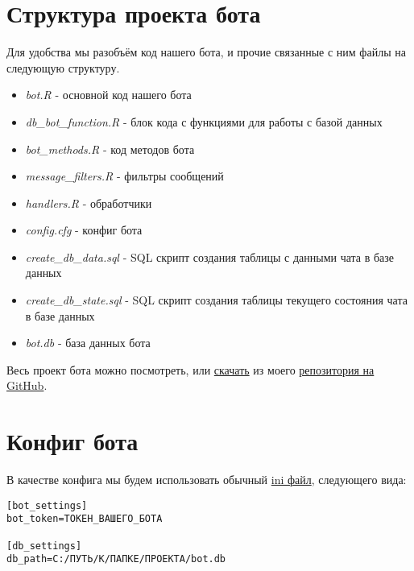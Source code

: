 \documentclass[
]{book}
\providecommand{\tightlist}{%
  \setlength{\itemsep}{0pt}\setlength{\parskip}{0pt}}
\begin{document}
\hypertarget{ux441ux442ux440ux443ux43aux442ux443ux440ux430-ux43fux440ux43eux435ux43aux442ux430-ux431ux43eux442ux430}{%
\section{Структура проекта бота}\label{ux441ux442ux440ux443ux43aux442ux443ux440ux430-ux43fux440ux43eux435ux43aux442ux430-ux431ux43eux442ux430}}

Для удобства мы разобъём код нашего бота, и прочие связанные с ним файлы на следующую структуру.

\begin{itemize}
\tightlist
\item
  \emph{bot.R} - основной код нашего бота
\item
  \emph{db\_bot\_function.R} - блок кода с функциями для работы с базой данных
\item
  \emph{bot\_methods.R} - код методов бота
\item
  \emph{message\_filters.R} - фильтры сообщений
\item
  \emph{handlers.R} - обработчики
\item
  \emph{config.cfg} - конфиг бота
\item
  \emph{create\_db\_data.sql} - SQL скрипт создания таблицы с данными чата в базе данных
\item
  \emph{create\_db\_state.sql} - SQL скрипт создания таблицы текущего состояния чата в базе данных
\item
  \emph{bot.db} - база данных бота
\end{itemize}

Весь проект бота можно посмотреть, или \href{https://github.com/selesnow/logical_tg_bot/archive/master.zip}{скачать} из моего \href{https://github.com/selesnow/logical_tg_bot}{репозитория на GitHub}.

\hypertarget{ux43aux43eux43dux444ux438ux433-ux431ux43eux442ux430}{%
\section{Конфиг бота}\label{ux43aux43eux43dux444ux438ux433-ux431ux43eux442ux430}}

В качестве конфига мы будем использовать обычный \href{https://ru.wikipedia.org/wiki/.ini}{ini файл}, следующего вида:

\begin{verbatim}
[bot_settings]
bot_token=ТОКЕН_ВАШЕГО_БОТА

[db_settings]
db_path=C:/ПУТЬ/К/ПАПКЕ/ПРОЕКТА/bot.db
\end{verbatim}
\end{document}
